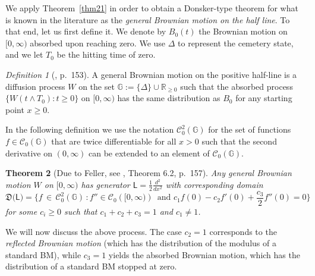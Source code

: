 \documentclass[12pt,a4paper]{article}
\theoremstyle{plain}
\newtheorem{theorem}{Theorem}[section]
\theoremstyle{remark}
\newtheorem{definition}[theorem]{Definition}
\newcommand{\msf}[1]{{\mathsf #1}}
\newcommand{\mc}[1]{{\mathcal #1}}
\newcommand{\mf}[1]{{\mathfrak #1}}
\newcommand{\bb}[1]{{\mathbb #1}}
\begin{document}
	We apply Theorem~\ref{thm21} in order to obtain a Donsker-type theorem for what is known in the literature as the \textit{general Brownian motion on the half line}. To that end, let us first define it. We denote by $B_0(t)$ the Brownian motion on $[0,\infty)$ absorbed upon reaching zero. We use $\Delta$ to represent the cemetery state, and we let $T_0$ be the hitting time of zero.
	\begin{definition}[\citealp{Knight}, p.\ 153]
		\label{def:GBM}
		A general Brownian motion  on the positive half-line is a diffusion process $W$ on the set $\bb{G} := \{\Delta\}\cup \bb R_{\geq 0}$ such that the absorbed process $\{W(t\wedge T_0):t\geq 0\}$ on $[0,\infty)$ has the same distribution as $B_0$ for any starting point $x\geq 0$.
	\end{definition}
	In the following definition we use the notation $\mc{C}_0^2(\bb{G})$ for the set of functions $f\in \mc{C}_0(\bb{G})$ that are twice differentiable for all $x> 0$ such that the second derivative on $(0,\infty)$ can be extended to an element of $\mc{C}_0(\bb{G})$.
	\begin{theorem}[Due to Feller, see \citealp{Knight}, Theorem 6.2, p.\ 157]\label{dgBM}
		Any general Brownian motion $ W$ on $[0, \infty)$ has generator $\msf L=\frac{1}{2}\frac{d^2}{dx^2}$ with corresponding domain
		\begin{equation}\label{domainBM}
			\mf{D}\big(\msf{L}\big)=\Big\{f\,\in\,\mc{C}_0^2(\bb{G})\,:f''\in \mc{C}_0(\bb{[0,\infty)})\, \text{ and } c_1f(0)-c_2f'(0)+\frac{c_3}{2}f''(0)=0\Big\}
		\end{equation}
		for some $c_i\geq 0$ such that $c_1 + c_2 + c_3 = 1$ and $c_1 \neq 1$.
	\end{theorem}
	We will now discuss the above process.
	The case $c_2 = 1$ corresponds to the \emph{reflected Brownian motion} (which has the distribution of the modulus of a standard BM), while $c_3 = 1$ yields the absorbed Brownian motion, which has the distribution of a standard BM stopped at zero.
\end{document}
